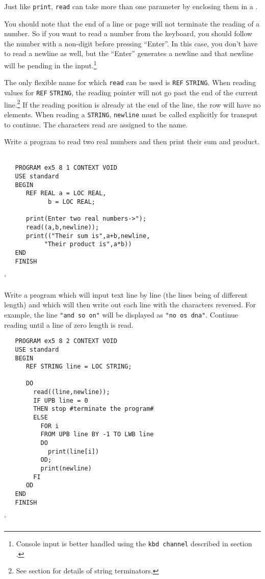 Just like \verb|print|, \verb|read| can take more than one parameter
by enclosing them in a .

You should note that the end of a line or page will not terminate the
reading of a number. So if you want to read a number from the
keyboard, you should follow the number with a non-digit before
pressing ``Enter''. In this case, you don't have to read a newline as
well, but the ``Enter'' generates a newline and that newline will be
pending in the input.\footnote{Console input is better handled using
the \texttt{kbd channel} described in section
\protect{}.}

The only flexible name for which \verb|read| can be used is
\verb|REF| \verb|STRING|. When reading values for \verb|REF|
\verb|STRING|, the reading pointer will not go past the end of the
current line.\footnote{See section \protect{} for
details of string terminators.} If the reading position is already at
the end of the line, the row will have no elements.  When reading a
\verb|STRING|, \verb|newline| must be called explicitly for transput
to continue.  The characters read are assigned to the name.

\begin{exercise}
\item Write a program to read two real numbers and then print their sum
and product. \ans \ %
\begin{verbatim}
   PROGRAM ex5 8 1 CONTEXT VOID
   USE standard
   BEGIN
      REF REAL a = LOC REAL,
            b = LOC REAL;

      print(Enter two real numbers->");
      read((a,b,newline));
      print(("Their sum is",a+b,newline,
           "Their product is",a*b))
   END
   FINISH
\end{verbatim}
'
\item Write a program which will input text line by line (the lines
being of different length) and which will then write out each line
with the characters reversed. For example, the line
\verb|"and so on"| will be displayed as \verb|"no os dna"|. Continue
reading until a line of zero length is read. \ans \ %
\begin{verbatim}
   PROGRAM ex5 8 2 CONTEXT VOID
   USE standard
   BEGIN
      REF STRING line = LOC STRING;

      DO
        read((line,newline));
        IF UPB line = 0
        THEN stop #terminate the program#
        ELSE
          FOR i
          FROM UPB line BY -1 TO LWB line
          DO
            print(line[i])
          OD;
          print(newline)
        FI
      OD
   END
   FINISH
\end{verbatim}
'
\end{exercise}


